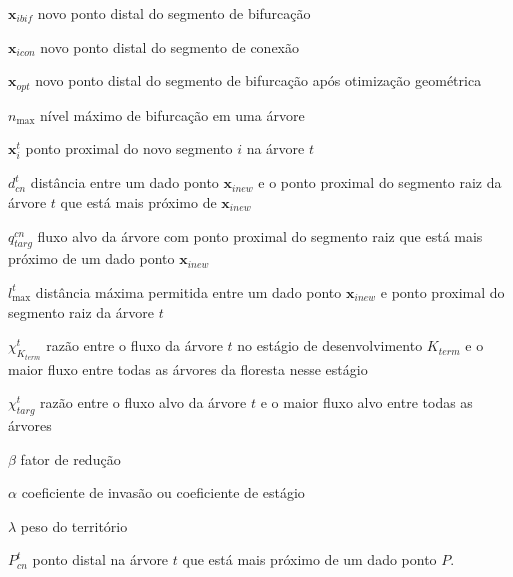 \begin{simbolos}
  \item[$\mathbf{x}_{ibif}$] novo ponto distal do segmento de bifurcação
  \item[$\mathbf{x}_{icon}$] novo ponto distal do segmento de conexão
  \item[$\mathbf{x}_{opt}$] novo ponto distal do segmento de bifurcação após otimização geométrica
  \item[$n_{\max}$] nível máximo de bifurcação em uma árvore
  \item[$\mathbf{x}_{i}^t$] ponto proximal do novo segmento $i$ na árvore $t$
  \item[$d_{cn}^t$] distância entre um dado ponto $\mathbf{x}_{inew}$ e o ponto proximal do segmento raiz da árvore $t$
    que está mais próximo de $\mathbf{x}_{inew}$
  \item[$q_{targ}^{cn}$] fluxo alvo da árvore com ponto proximal do segmento raiz que está mais próximo de um dado
    ponto $\mathbf{x}_{inew}$
  \item[$l_{\max}^t$] distância máxima permitida entre um dado ponto $\mathbf{x}_{inew}$ e ponto proximal do segmento raiz
    da árvore $t$
  \item[$\chi_{K_{term}}^t$] razão entre o fluxo da árvore $t$ no estágio de desenvolvimento $K_{term}$ e o maior fluxo 
  entre todas as árvores da floresta nesse estágio
  \item[$\chi_{targ}^t$] razão entre o fluxo alvo da árvore $t$ e o maior fluxo alvo entre todas as árvores
  \item[$\beta$] fator de redução
  \item[$\alpha$] coeficiente de invasão ou coeficiente de estágio
  \item[$\lambda$] peso do território
  \item[$P_{cn}^t$] ponto distal na árvore $t$ que está mais próximo de um dado ponto $P$.
\end{simbolos}